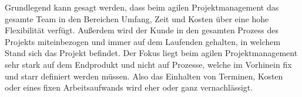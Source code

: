 

Grundlegend kann gesagt werden, dass beim agilen Projektmanagement das gesamte Team in den Bereichen Umfang, Zeit und Kosten über eine hohe Flexibilität verfügt. Außerdem wird der Kunde in den gesamten Prozess des Projekts miteinbezogen und immer auf dem Laufenden gehalten, in welchem Stand sich das Projekt befindet. Der Fokus liegt beim agilen Projektmanagement sehr stark auf dem Endprodukt und nicht auf Prozesse, welche im Vorhinein fix und starr definiert werden müssen. Also das Einhalten von Terminen, Kosten oder eines fixen Arbeitsaufwands wird eher oder ganz vernachlässigt. \cite{agil}
